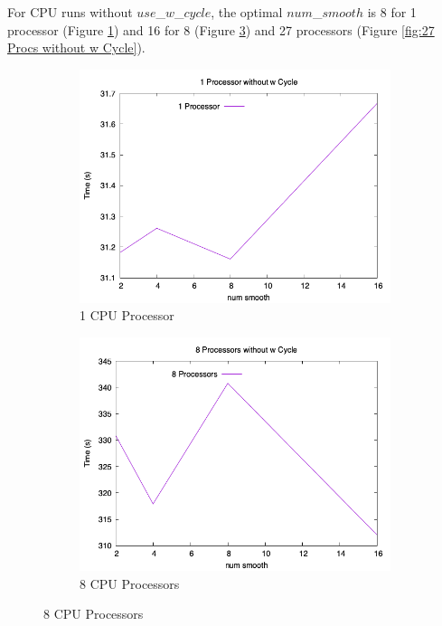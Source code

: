 \documentclass{article}
\begin{document}
For CPU runs without $use$\_$w$\_$cycle$, the optimal $num$\_$smooth$ is 8 for 1 processor (Figure \ref{fig:1 Proc without w Cycle}) and 16 for 8 (Figure \ref{fig:8 Procs without w Cycle}) and 27 processors (Figure \ref{fig:27 Procs without w Cycle}). 

\begin{figure}[H]
    \centering
    \begin{subfigure}{0.48\textwidth}
        \includegraphics[width=\textwidth]{1 Proc without w Cycle.png}
        \caption{1 CPU Processor}
        \label{fig:1 Proc without w Cycle}
    \end{subfigure}
    \hfill
    \begin{subfigure}{0.48\textwidth}
        \includegraphics[width=\textwidth]{8 Proc without w Cycle.png}
        \caption{8 CPU Processors}
        \label{fig:8 Procs without w Cycle}
    \end{subfigure}
    

\end{figure}
\end{document}
